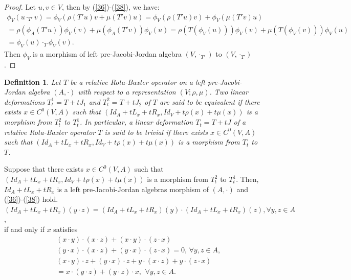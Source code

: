 \documentclass[12pt]{amsart}
\newtheorem{definition}[Theorem]{Definition}
\begin{document}
\begin{proof}
	Let $ u,v\in V $, then by (\ref{36})-(\ref{38}),  we have:\\
	$ \begin{array}{lll}
		\phi_{V} (u\cdot_{T'} v)=\phi_{V}(\rho(T'u)v+\mu(T'v)u)=\phi_{V}(\rho(T'u)v)+\phi_{V}(\mu(T'v)u)\\
		=\rho(\phi_A(T'u))\phi_{V}(v)+\mu(\phi_A(T'v))\phi_{V}(u)=\rho(T(\phi_{V}(u)))\phi_{V}(v)+\mu(T(\phi_{V}(v)))\phi_{V}(u)\\
		=\phi_{V}(u)\cdot_{T}\phi_{V}(v).
	\end{array} $\\
	Then $ \phi_{V} $ is a morphism of left pre-Jacobi-Jordan algebra $ (V,\cdot_{T'}) $ to $ (V,\cdot_{T}) $ .
\end{proof}
\begin{definition}\label{D12}
	Let $ T $ be a relative Rota-Baxter operator on a left pre-Jacobi-Jordan algebra $ (A,\cdot) $ with respect to a representation $(V;\rho,\mu) $. Two linear deformations $ T^{1}_{t}=T+tJ_{1} $ and $ T^{2}_{t}=T+tJ_{2} $ of $T$ are said to be equivalent if there exists $ x\in C^0(V,A) $ such that $ (Id_{A}+tL_{x}+tR_x,Id_{V}+t\rho(x)+t\mu(x)) $ is a morphism from $ T_{t}^{2} $ to $ T_{t}^{1} $. In particular, a linear deformation $ T_{t}=T+tJ $ of a relative Rota-Baxter operator $ T $ is said to be trivial if there exists $ x\in C^0(V,A) $ such that $ (Id_{A}+tL_{x}+tR_x,Id_{V}+t\rho(x)+t\mu(x)) $ is a morphism from $ T_{t} $ to $ T $.  	
\end{definition}
Suppose that there exists $ x\in C^0(V,A) $ such that $ (Id_{A}+tL_{x}+tR_x,Id_{V}+t\rho(x)+t\mu(x)) $ is a morphism from $T_{t}^{2} $ to $ T_{t}^{1} $. Then,
 $ Id_{A}+tL_{x}+tR_x $ is a left pre-Jacobi-Jordan algebras morphism of $ (A,\cdot) $ and (\ref{36})-(\ref{38}) hold.\\  
$(Id_{A}+tL_{x}+tR_x)(y\cdot z)=(Id_{A}+tL_{x}+tR_x)(y)\cdot(Id_{A}+tL_{x}+tR_x)(z), \forall y,z\in A $,\\
if and only if $ x $ satisfies
\begin{eqnarray}
	&&(x\cdot y)\cdot (x\cdot z)+(x\cdot y)\cdot (z\cdot x)\nonumber\\
	&&(y\cdot x)\cdot (x\cdot z)+(y\cdot x)\cdot (z\cdot x)=0, \, \forall y, z\in A,\label{39}\\
	&&(x\cdot y)\cdot z+(y\cdot x)\cdot z+ y\cdot(x\cdot z)+y\cdot(z\cdot x)\nonumber\\
	&&=x\cdot(y\cdot z)+(y\cdot z)\cdot x,\,\ \forall y, z\in A.\label{40}
\end{eqnarray}
\end{document}
